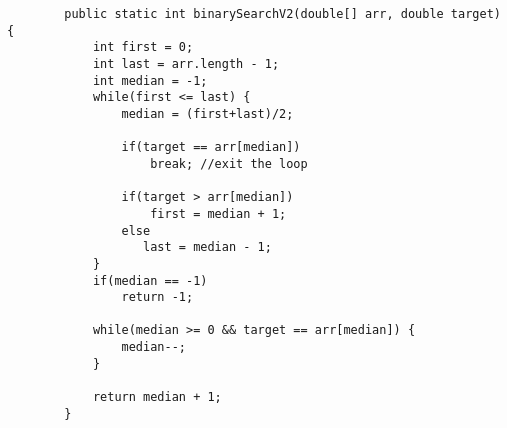 \begin{questions}
\begin{enumerate}
	\ifprintanswers
	\begin{lstlisting}
		public static int binarySearchV2(double[] arr, double target) {
			int first = 0;
			int last = arr.length - 1;
			int median = -1;
			while(first <= last) {
   				median = (first+last)/2;
   				
   				if(target == arr[median])
   					break; //exit the loop
   					
   				if(target > arr[median])
					first = median + 1;
				else
				   last = median - 1;
			}
			if(median == -1)
				return -1;
	
			while(median >= 0 && target == arr[median]) {
				median--;
			}
	
			return median + 1;
		}	
	\end{lstlisting}
	\else
	\fi
\end{enumerate}

\end{questions}

